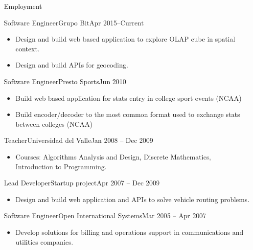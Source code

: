 \documentclass[]{mcdowellcv}
\begin{document}
	\makeheader
	
	\begin{cvsection}{Employment}
		\begin{cvsubsection}{Software Engineer}{Grupo Bit}{Apr 2015--Current}
			\begin{itemize}
				\item Design and build web based application to explore OLAP cube in spatial context.
				\item Design and build APIs for geocoding.			 			
			\end{itemize}
		\end{cvsubsection}
		
		\begin{cvsubsection}{Software Engineer}{Presto Sports}{Jun 2010}						
			\begin{itemize}
				\item Build web based application for stats entry in college sport events (NCAA)
				\item Build encoder/decoder to the most common format used to exchange stats between colleges (NCAA)			
			\end{itemize}
		\end{cvsubsection}
%		
%		
		\begin{cvsubsection}{Teacher}{Universidad del Valle}{Jan 2008 -- Dec 2009}		
			\begin{itemize}
				\item Courses: Algorithms Analysis and Design, Discrete Mathematics, Introduction to Programming.			
			\end{itemize}
		\end{cvsubsection}
		
		\begin{cvsubsection}{Lead Developer}{Startup project}{Apr 2007 -- Dec 2009}		
			\begin{itemize}
				\item Design and build web application and APIs to solve vehicle routing problems.
			\end{itemize}
		\end{cvsubsection}
		
		\begin{cvsubsection}{Software Engineer}{Open International Systems}{Mar 2005 -- Apr 2007}	
			\begin{itemize}
				\item Develop solutions for billing and operations support in communications and utilities companies.
			\end{itemize}
			
		\end{cvsubsection}
	\end{cvsection}
	
\end{document}
